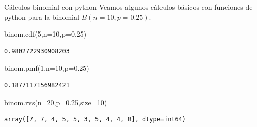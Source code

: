 \documentclass[
  ignorenonframetext,
  aspectratio=169]{beamer}
\newenvironment{Shaded}{\begin{snugshade}}{\end{snugshade}}
\newcommand{\DecValTok}[1]{\textcolor[rgb]{0.68,0.00,0.00}{#1}}
\newcommand{\FloatTok}[1]{\textcolor[rgb]{0.68,0.00,0.00}{#1}}
\newcommand{\NormalTok}[1]{\textcolor[rgb]{0.00,0.23,0.31}{#1}}
\newcommand{\OperatorTok}[1]{\textcolor[rgb]{0.37,0.37,0.37}{#1}}
\begin{document}
\begin{frame}[fragile]{Cálculos binomial con python}
\protect\hypertarget{cuxe1lculos-binomial-con-python}{}
Veamos algunos cálculos básicos con funciones de python para la binomial
\(B(n=10,p=0.25)\).

\begin{Shaded}
\begin{Highlighting}[]
\NormalTok{binom.cdf(}\DecValTok{5}\NormalTok{,n}\OperatorTok{=}\DecValTok{10}\NormalTok{,p}\OperatorTok{=}\FloatTok{0.25}\NormalTok{)}
\end{Highlighting}
\end{Shaded}

\begin{verbatim}
0.9802722930908203
\end{verbatim}

\begin{Shaded}
\begin{Highlighting}[]
\NormalTok{binom.pmf(}\DecValTok{1}\NormalTok{,n}\OperatorTok{=}\DecValTok{10}\NormalTok{,p}\OperatorTok{=}\FloatTok{0.25}\NormalTok{)}
\end{Highlighting}
\end{Shaded}

\begin{verbatim}
0.1877117156982421
\end{verbatim}

\begin{Shaded}
\begin{Highlighting}[]
\NormalTok{binom.rvs(n}\OperatorTok{=}\DecValTok{20}\NormalTok{,p}\OperatorTok{=}\FloatTok{0.25}\NormalTok{,size}\OperatorTok{=}\DecValTok{10}\NormalTok{)}
\end{Highlighting}
\end{Shaded}

\begin{verbatim}
array([7, 7, 4, 5, 5, 3, 5, 4, 4, 8], dtype=int64)
\end{verbatim}
\end{frame}
\end{document}
